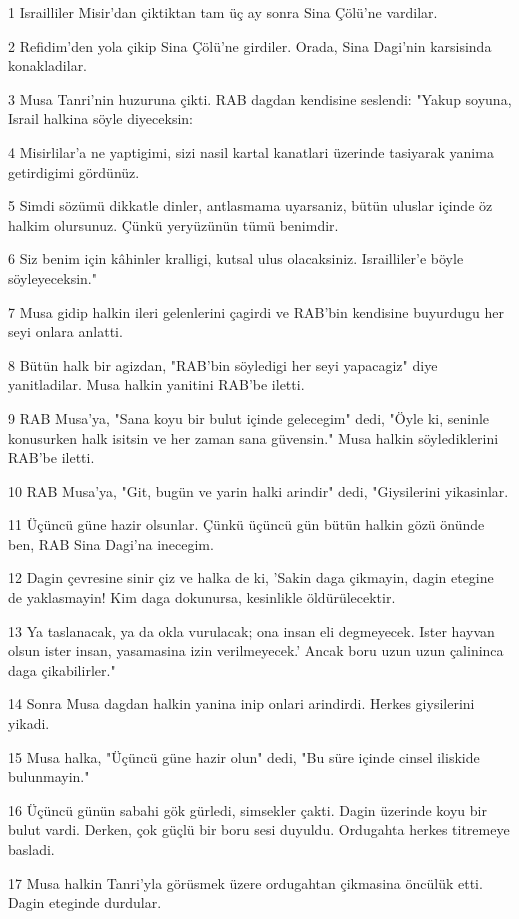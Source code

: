 \par 1 Israilliler Misir'dan çiktiktan tam üç ay sonra Sina Çölü'ne vardilar.
\par 2 Refidim'den yola çikip Sina Çölü'ne girdiler. Orada, Sina Dagi'nin karsisinda konakladilar.
\par 3 Musa Tanri'nin huzuruna çikti. RAB dagdan kendisine seslendi: "Yakup soyuna, Israil halkina söyle diyeceksin:
\par 4 Misirlilar'a ne yaptigimi, sizi nasil kartal kanatlari üzerinde tasiyarak yanima getirdigimi gördünüz.
\par 5 Simdi sözümü dikkatle dinler, antlasmama uyarsaniz, bütün uluslar içinde öz halkim olursunuz. Çünkü yeryüzünün tümü benimdir.
\par 6 Siz benim için kâhinler kralligi, kutsal ulus olacaksiniz. Israilliler'e böyle söyleyeceksin."
\par 7 Musa gidip halkin ileri gelenlerini çagirdi ve RAB'bin kendisine buyurdugu her seyi onlara anlatti.
\par 8 Bütün halk bir agizdan, "RAB'bin söyledigi her seyi yapacagiz" diye yanitladilar. Musa halkin yanitini RAB'be iletti.
\par 9 RAB Musa'ya, "Sana koyu bir bulut içinde gelecegim" dedi, "Öyle ki, seninle konusurken halk isitsin ve her zaman sana güvensin." Musa halkin söylediklerini RAB'be iletti.
\par 10 RAB Musa'ya, "Git, bugün ve yarin halki arindir" dedi, "Giysilerini yikasinlar.
\par 11 Üçüncü güne hazir olsunlar. Çünkü üçüncü gün bütün halkin gözü önünde ben, RAB Sina Dagi'na inecegim.
\par 12 Dagin çevresine sinir çiz ve halka de ki, 'Sakin daga çikmayin, dagin etegine de yaklasmayin! Kim daga dokunursa, kesinlikle öldürülecektir.
\par 13 Ya taslanacak, ya da okla vurulacak; ona insan eli degmeyecek. Ister hayvan olsun ister insan, yasamasina izin verilmeyecek.' Ancak boru uzun uzun çalininca daga çikabilirler."
\par 14 Sonra Musa dagdan halkin yanina inip onlari arindirdi. Herkes giysilerini yikadi.
\par 15 Musa halka, "Üçüncü güne hazir olun" dedi, "Bu süre içinde cinsel iliskide bulunmayin."
\par 16 Üçüncü günün sabahi gök gürledi, simsekler çakti. Dagin üzerinde koyu bir bulut vardi. Derken, çok güçlü bir boru sesi duyuldu. Ordugahta herkes titremeye basladi.
\par 17 Musa halkin Tanri'yla görüsmek üzere ordugahtan çikmasina öncülük etti. Dagin eteginde durdular.

